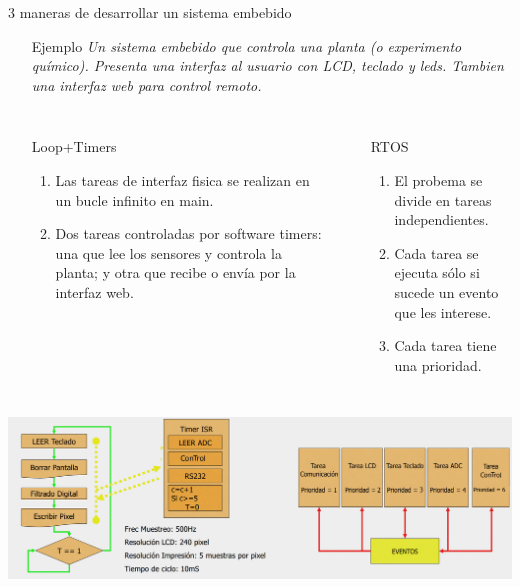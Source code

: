 \documentclass[8pt,aspectratio=169,compress]{beamer}
\begin{document}
\begin{frame}{3 maneras de desarrollar un sistema embebido}

\begin{itemize}
\item [Ejemplo] \textit{Un sistema embebido que controla una planta (o experimento químico). Presenta una interfaz al usuario con LCD, teclado y leds. Tambien una interfaz web para control remoto.}
\end{itemize}

    \begin{columns}[onlytextwidth,T]
      \column{\dimexpr\linewidth-70mm-5mm}


\begin{itemize}
\item [Loop+Timers]

\begin{enumerate}
\item Las tareas de interfaz fisica se realizan en un bucle infinito en main.
\item Dos tareas controladas por software timers: una que lee los sensores y controla la planta; y otra que recibe o envía por la interfaz web.
\end{enumerate}
\end{itemize}


      \column{70mm}

\begin{itemize}
\item [RTOS]

\begin{enumerate}
\item El probema se divide en tareas independientes.
\item Cada tarea se ejecuta sólo si sucede un evento que les interese.
\item Cada tarea tiene una prioridad.
\end{enumerate}

\end{itemize}
    \end{columns}
     \includegraphics[width=140mm]{images/loop-vs-rtos.jpg}
\end{frame}
\end{document}
